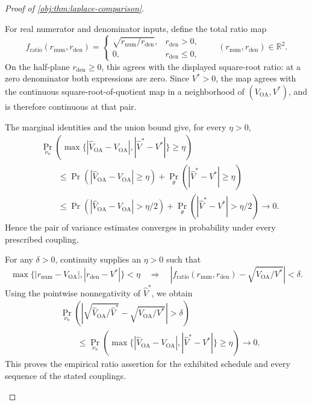 \begin{proof}[Proof of \cref{obj:thm:laplace-comparison}]
\begin{enumerate}
For real numerator and denominator inputs, define the total ratio map
\[
f_{\mathrm{ratio}}(r_{\mathrm{num}},r_{\mathrm{den}})
=
\begin{cases}
\sqrt{r_{\mathrm{num}}/r_{\mathrm{den}}},
&r_{\mathrm{den}}>0,\\
0,&r_{\mathrm{den}}\le0,
\end{cases}
\qquad
(r_{\mathrm{num}},r_{\mathrm{den}})\in\mathbb R^2.
\]
On the half-plane \(r_{\mathrm{den}}\ge0\), this agrees with the displayed square-root ratio: at a zero denominator both expressions are zero. Since \(V^*>0\), the map agrees with the continuous square-root-of-quotient map in a neighborhood of \((V_{\mathrm{OA}},V^*)\), and is therefore continuous at that pair.

The marginal identities and the union bound give, for every \(\eta>0\),
\[
\begin{aligned}
&\Pr_{\nu_n}\!\left(
\max\{|\widehat V_{\mathrm{OA}}-V_{\mathrm{OA}}|,
       |\widehat V^*-V^*|\}\ge\eta
\right)\\
&\qquad\le
\Pr\!\left(|\widehat V_{\mathrm{OA}}-V_{\mathrm{OA}}|\ge\eta\right)
+
\Pr_\theta\!\left(|\widehat V^*-V^*|\ge\eta\right)\\
&\qquad\le
\Pr\!\left(|\widehat V_{\mathrm{OA}}-V_{\mathrm{OA}}|>\eta/2\right)
+
\Pr_\theta\!\left(|\widehat V^*-V^*|>\eta/2\right)
\longrightarrow0.
\end{aligned}
\]
Hence the pair of variance estimates converges in probability under every prescribed coupling.

For any \(\delta>0\), continuity supplies an \(\eta>0\) such that
\[
\max\{|r_{\mathrm{num}}-V_{\mathrm{OA}}|,
       |r_{\mathrm{den}}-V^*|\}<\eta
\quad\Longrightarrow\quad
\left|
f_{\mathrm{ratio}}(r_{\mathrm{num}},r_{\mathrm{den}})
-\sqrt{V_{\mathrm{OA}}/V^*}
\right|<\delta.
\]
Using the pointwise nonnegativity of \(\widehat V^*\), we obtain
\[
\begin{aligned}
&\Pr_{\nu_n}\!\left(
\left|
\sqrt{\widehat V_{\mathrm{OA}}/\widehat V^*}
-\sqrt{V_{\mathrm{OA}}/V^*}
\right|>\delta
\right)\\
&\qquad\le
\Pr_{\nu_n}\!\left(
\max\{|\widehat V_{\mathrm{OA}}-V_{\mathrm{OA}}|,
       |\widehat V^*-V^*|\}\ge\eta
\right)
\longrightarrow0.
\end{aligned}
\]
This proves the empirical ratio assertion for the exhibited schedule and every sequence of the stated couplings.


\end{enumerate}
\end{proof}
